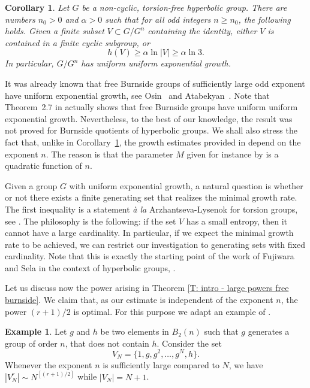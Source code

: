 \documentclass[JEP,XML,SOM,Unicode, NoEqCountersInSection,published]{cedram}
\theoremstyle{plain}
\newtheorem{cor}[thm]{Corollary}
\theoremstyle{definition}
\newtheorem{ex}[thm]{Example}
\begin{document}
\begin{cor}
\label{C: intro - large powers free burnside}
Let $G$ be a non-cyclic, torsion-free hyperbolic group.
There are numbers $n_0>0$ and $\alpha>0$ such that for all odd integers $n \geqslant n_0$, the following holds.
Given a finite subset $V \subset G/G^n$ containing the identity, either $V$ is contained in a finite cyclic subgroup, or
\[
h(V) \geq \alpha \ln |V| \geq \alpha \ln 3.
\]
In particular, $G/G^n$ has uniform uniform exponential growth.
\end{cor}

It was already known that free Burnside groups of sufficiently large odd exponent have uniform exponential growth, see Osin~\cite[Cor.\,1.4]{osin_uniform_2007} and Atabekyan~\cite[Cor.\,3]{atabekyan_uniform_2009}.
Note that Theorem~2.7 in \cite{osin_uniform_2007} actually shows that free Burnside groups have uniform uniform exponential growth.
Nevertheless, to the best of our knowledge, the result was not proved for Burnside quotients of hyperbolic groups.
We shall also stress the fact that, unlike in Corollary~\ref{C: intro - large powers free burnside}, the growth estimates provided in \cite{osin_uniform_2007, atabekyan_uniform_2009} depend on the exponent $n$.
The reason is that the parameter $M$ given for instance by \cite[Th.\,2.7]{osin_uniform_2007} is a quadratic function of $n$.

Given a group $G$ with uniform exponential growth, a natural question is whether or not there exists a finite generating set that realizes the minimal growth rate.
The first inequality is a statement \emph{à la} Arzhantseva-Lysenok for torsion groups, see \cite[Th.\,1]{arzhantseva_lower_2006}.
The philosophy is the following: if the set $V$ has a small entropy, then it cannot have a large cardinality.
In particular, if we expect the minimal growth rate to be achieved, we can restrict our investigation to generating sets with fixed cardinality.
Note that this is exactly the starting point of the work of Fujiwara and Sela in the context of hyperbolic groups, \cite{fujiwara_rates_2020}.

Let us discuss now the power arising in Theorem \ref{T: intro - large powers free burnside}.
We claim that, as our estimate is independent of the exponent $n$, the power $(r+1)/2$ is optimal.
For this purpose we adapt an example of \cite{safin_powers_2011}.

\begin{ex} \label{E: optimal}
Let $g$ and $h$ be two elements in $B_2(n)$ such that $g$ generates a group of order $n$, that does not contain $h$.
Consider the set
\begin{equation*}
V_N=\{1, g, g^2 ,\ldots , g^N, h\}.
\end{equation*}
Whenever the exponent $n$ is sufficiently large compared to $N$, we have $|V_N^r|\sim N^{[(r+1)/2]}$ while $|V_N|=N+1$.
\end{ex}
\end{document}
